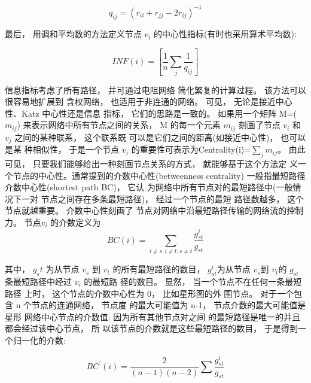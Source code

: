 				$$q_{ij}=(r_{ii}+r_{jj}-2r_{ij})^{-1}$$

				最后， 用调和平均数的方法定义节点 $v_i$ 的中心性指标(有时也采用算术平均数)\parencite{Poulin2000Dynamical}:

				$$ INF(i)=[\frac{1}{n} \sum\limits_j {\frac{1}{q_{ij}}}] $$

				信息指标考虑了所有路径， 并可通过电阻网络 简化繁复的计算过程。 该方法可以很容易地扩展到 含权网络， 也适用于非连通的网络。
				可见， 无论是接近中心性、Katz 中心性还是信息 指标， 它们的思路是一致的。 如果用一个矩阵 M=($m_{ij}$) 来表示网络中所有节点之间的关系， M 的每一个元素 $m_{ij}$ 刻画了节点 $v_i$ 和 $v_j$ 之间的某种联系， 这个联系既 可以是它们之间的距离(如接近中心性)， 也可以是某 种相似性， 于是一个节点 $v_i$ 的重要性可表示为Centrality(i)=$\sum\limits_j {m_{ij}}$。 由此可见， 只要我们能够给出一种刻画节点关系的方式， 就能够基于这个方法定 义一个节点的中心性。通常提到的介数中心性(betweenness centrality) 一般指最短路径介数中心性(shortest path BC)， 它认 为网络中所有节点对的最短路径中(一般情况下一对 节点之间存在多条最短路径)， 经过一个节点的最短 路径数越多， 这个节点就越重要。 介数中心性刻画了 节点对网络中沿最短路径传输的网络流的控制力。 节点$v_i$ 的介数定义为
\[BC(i) = \sum\limits_{i \ne s,i \ne t,s \ne t} {\frac{{g_{st}^i}}{{{g_{st}}}}} \]

				其中， $g_st$ 为从节点 $v_s$ 到 $v_t$ 的所有最短路径的数目， $g_{st}^i$为从节点 $v_s$到 $v_t$的 $g_{st}$ 条最短路径中经过 $v_i$ 的最短路 径的数目。 显然， 当一个节点不在任何一条最短路径 上时， 这个节点的介数中心性为 0， 比如星形图的外 围节点。 对于一个包含 n 个节点的连通网络， 节点度 的最大可能值为 n-1， 节点介数的最大可能值是星形 网络中心节点的介数值: 因为所有其他节点对之间 的最短路径是唯一的并且都会经过该中心节点， 所 以该节点的介数就是这些最短路径的数目， 于是得到一个归一化的介数:

\[BC^{'}(i) = \frac{2}{{(n - 1)(n - 2)}}\sum {\frac{{g_{st}^i}}{{{g_{st}}}}} \]

